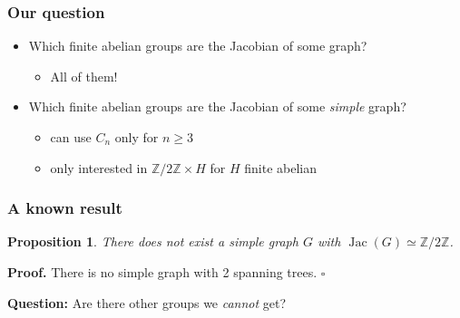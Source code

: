 \documentclass[mathserif, serif, xcolor=dvipsnames]{beamer}
\newtheorem{prop}{Proposition}
\newcommand{\Z}{\ensuremath{\mathbb{Z}}}
\DeclareMathOperator{\Jac}{Jac}
\begin{document}
\begin{frame}
  \frametitle{Our question} 

  \begin{itemize}
  \item
    Which finite abelian groups are the Jacobian of some graph?  

  \pause

  \begin{itemize}
  \item All of them!
  \end{itemize}

  \pause
\item
  Which finite abelian groups are the Jacobian of some \emph{simple}
  graph?
  
  \begin{itemize}
  \item can use $C_n$ only for $n\ge3$
  \item only interested in $\Z/2\Z\times H$ for $H$ finite abelian
  \end{itemize}
  
\end{itemize}
  
\end{frame}

\begin{frame}
 \frametitle{A known result} 
  \begin{prop}
    There does not exist a simple graph $G$ with $\Jac(G) \simeq \Z/2\Z$. 
  \end{prop}
 \vspace{0.3cm}
 
 \pause
  
 \textbf{Proof.} There is no simple graph with 2 spanning trees. $\square$

  \pause 

  \vspace{1.8cm}

  \textbf{Question:} Are there other groups we \emph{cannot} get?
\end{frame}
\end{document}
